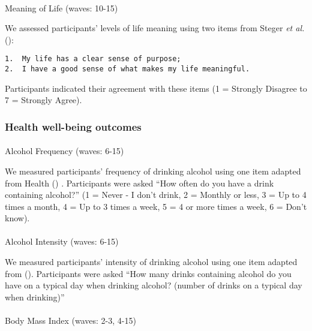 \documentclass[
  singlecolumn,
  9pt]{scrartcl}
\makeatletter
\let\oldparagraph\paragraph
\renewcommand{\paragraph}{
    \@ifstar
      \xxxParagraphStar
      \xxxParagraphNoStar
  }
\newcommand{\xxxParagraphStar}[1]{\oldparagraph*{#1}\mbox{}}
\newcommand{\xxxParagraphNoStar}[1]{\oldparagraph{#1}\mbox{}}
\makeatother
\begin{document}
\paragraph{Meaning of Life (waves:
10-15)}\label{meaning-of-life-waves-10-15}

We assessed participants' levels of life meaning using two items from
Steger \emph{et al.} ():

\begin{verbatim}
1.  My life has a clear sense of purpose;
2.  I have a good sense of what makes my life meaningful.
\end{verbatim}

Participants indicated their agreement with these items (1 = Strongly
Disagree to 7 = Strongly Agree).

\subsubsection{Health well-being
outcomes}\label{health-well-being-outcomes}

\paragraph{Alcohol Frequency (waves:
6-15)}\label{alcohol-frequency-waves-6-15}

We measured participants' frequency of drinking alcohol using one item
adapted from Health () .
Participants were asked ``How often do you have a drink containing
alcohol?'' (1 = Never - I don't drink, 2 = Monthly or less, 3 = Up to 4
times a month, 4 = Up to 3 times a week, 5 = 4 or more times a week, 6 =
Don't know).

\paragraph{Alcohol Intensity (waves:
6-15)}\label{alcohol-intensity-waves-6-15}

We measured participants' intensity of drinking alcohol using one item
adapted from ().
Participants were asked ``How many drinks containing alcohol do you have
on a typical day when drinking alcohol? (number of drinks on a typical
day when drinking)''

\paragraph{Body Mass Index (waves: 2-3,
4-15)}\label{body-mass-index-waves-2-3-4-15}
\end{document}
